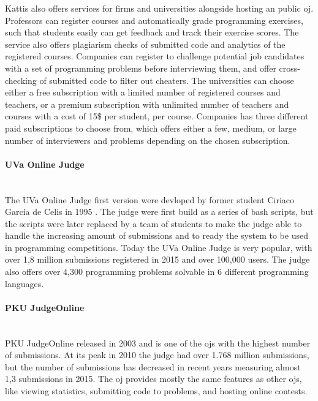 Kattis also offers services for firms and universities alongside hosting an public \gls{oj}. Professors can register courses and automatically grade programming exercises, such that students easily can get feedback and track their exercise scores. The service also offers plagiarism checks of submitted code and analytics of the registered courses. Companies can register to challenge potential job candidates with a set of programming problems before interviewing them, and offer cross-checking of submitted code to filter out cheaters. The universities can choose either a free subscription with a limited number of registered courses and teachers, or a premium subscription with unlimited number of teachers and courses with a cost of 15\$ per student, per course. Companies has three different paid subscriptions to choose from, which offers either a few, medium, or large number of interviewers and problems depending on the chosen subscription.

\paragraph*{UVa Online Judge} \hfill \\
The UVa Online Judge \cite{UVA} first version were devloped by former student Ciriaco García de Celis in 1995 \cite{a:Revilla2008}. The judge were first build as a series of bash scripts, but the scripts were later replaced by a team of students to make the judge able to handle the increasing amount of submissions and to ready the system to be used in programming competitions. Today the UVa Online Judge is very popular, with over 1,8 million submissions registered in 2015 and over 100,000 users. The judge also offers over 4,300 programming problems solvable in 6 different programming languages.

\paragraph*{PKU JudgeOnline} \hfill \\
PKU JudgeOnline \cite{PKU} released in 2003 and is one of the \gls{ojs} with the highest number of submissions. At its peak in 2010 the judge had over 1.768 million submissions, but the number of submissions has decreased in recent years measuring almost 1,3 submissions in 2015. The \gls{oj} provides mostly the same features as other \gls{ojs}, like viewing statistics, submitting code to problems, and hosting online contests.


